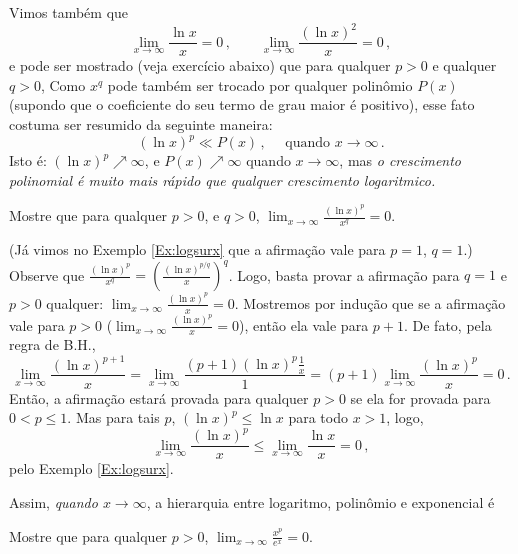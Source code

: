 Vimos também que
$$
\lim_{x\to \infty}\frac{\ln x}{x}=0\,,\quad\quad 
\lim_{x\to \infty}\frac{(\ln x)^2}{x}=0\,,
$$
e pode ser mostrado (veja exercício abaixo) que para qualquer
$p>0$ e qualquer $q>0$,
Como $x^q$ pode também ser trocado
por qualquer polinômio $P(x)$ (supondo que o coeficiente do
seu termo de grau maior é positivo), esse fato costuma ser
resumido da seguinte
maneira:
$$\boxed{(\ln x)^p\ll P(x)\,,\quad\text{ quando }x\to \infty\,.}$$
Isto é: $(\ln x)^p\nearrow \infty$, e 
$P(x)\nearrow \infty$ quando $x\to \infty$,
mas \emph{o crescimento polinomial é muito mais rápido que
qualquer crescimento logaritmico.}

\begin{exo}
Mostre que para qualquer $p>0$, e $q>0$, $\lim_{x\to \infty}\frac{(\ln
x)^p}{x^q}=0$.
\begin{sol}
(Já vimos no Exemplo \ref{Ex:logsurx} que a afirmação vale para $p=1$, $q=1$.)
Observe que 
$\frac{(\ln
x)^p}{x^q}=(\frac{(\ln
x)^{p/q}}{x})^q$. Logo, basta provar a afirmação para $q=1$ e $p>0$ qualquer:
$\lim_{x\to \infty}\frac{(\ln
x)^p}{x}=0$.
Mostremos por indução que se a afirmação vale para $p>0$ 
($\lim_{x\to \infty}\frac{(\ln
x)^{p}}{x}=0$), então ela vale para $p+1$. De fato, pela regra de B.H., 
$$
\lim_{x\to \infty}\frac{(\ln x)^{p+1}}{x}=\lim_{x\to \infty}\frac{(p+1)(\ln
x)^{p}\tfrac{1}{x}}{1}=
(p+1)\lim_{x\to \infty}\frac{(\ln
x)^{p}}{x}=0\,.
$$
Então, a afirmação estará provada para qualquer $p>0$ se ela for provada para
$0<p\leq 1$. Mas para tais $p$, $(\ln x)^p\leq \ln x$ para todo $x>1$, logo, 
$$
\lim_{x\to \infty}\frac{(\ln x)^p}{x}\leq \lim_{x\to \infty}\frac{\ln x}{x}=0\,,
$$ 
pelo Exemplo \ref{Ex:logsurx}.
\end{sol}
\end{exo}

Assim, \emph{quando $x\to \infty$}, a hierarquia entre logaritmo, polinômio e
exponencial é
\begin{exo}
Mostre que para qualquer $p>0$, $\lim_{x\to \infty}\frac{x^p}{e^{x}}=0$.
\end{exo}

